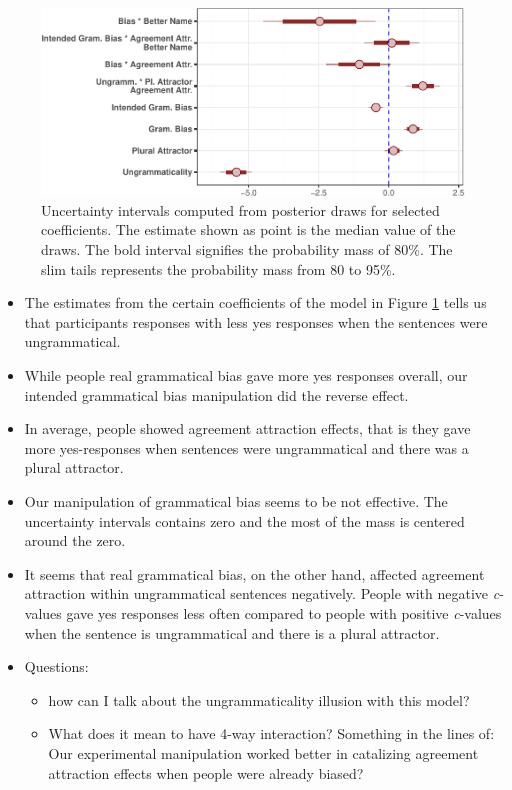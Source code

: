 \documentclass[
  10pt,
  english,
  doc,floatsintext]{apa6}
\providecommand{\tightlist}{%
  \setlength{\itemsep}{0pt}\setlength{\parskip}{0pt}}
\begin{document}
\begin{figure}
\centering
\includegraphics{paperdraft_files/figure-latex/BiasModelCoefPlot-1.pdf}
\caption{\label{fig:BiasModelCoefPlot}Uncertainty intervals computed from posterior draws for selected coefficients. The estimate shown as point is the median value of the draws. The bold interval signifies the probability mass of 80\%. The slim tails represents the probability mass from 80 to 95\%.}
\end{figure}

\begin{itemize}
\item
  The estimates from the certain coefficients of the model in Figure \ref{fig:BiasModelCoefPlot} tells us that participants responses with less yes responses when the sentences were ungrammatical.
\item
  While people real grammatical bias gave more yes responses overall, our intended grammatical bias manipulation did the reverse effect.
\item
  In average, people showed agreement attraction effects, that is they gave more yes-responses when sentences were ungrammatical and there was a plural attractor.
\item
  Our manipulation of grammatical bias seems to be not effective. The uncertainty intervals contains zero and the most of the mass is centered around the zero.
\item
  It seems that real grammatical bias, on the other hand, affected agreement attraction within ungrammatical sentences negatively. People with negative \emph{c}-values gave yes responses less often compared to people with positive \emph{c}-values when the sentence is ungrammatical and there is a plural attractor.
\item
  Questions:

  \begin{itemize}
  \tightlist
  \item
    how can I talk about the ungrammaticality illusion with this model?
  \item
    What does it mean to have 4-way interaction? Something in the lines of: Our experimental manipulation worked better in catalizing agreement attraction effects when people were already biased?
  \end{itemize}
\end{itemize}
\end{document}
